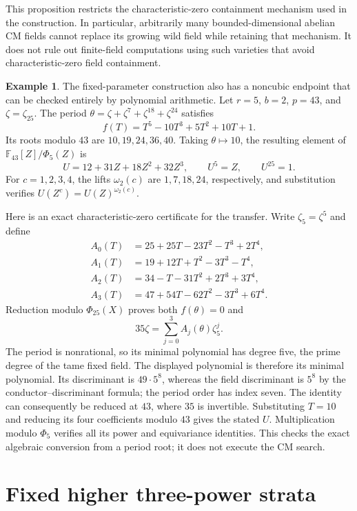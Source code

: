\documentclass[11pt]{article}
\theoremstyle{definition}
\newtheorem{example}[theorem]{Example}
\theoremstyle{remark}
\begin{document}
This proposition restricts the characteristic-zero containment
mechanism used in the construction. In particular, arbitrarily
many bounded-dimensional abelian CM fields cannot replace its
growing wild field while retaining that mechanism. It does not
rule out finite-field computations using such varieties that
avoid characteristic-zero field containment.



\begin{example}\label{ex:fixed-wild-r5-f43}
The fixed-parameter construction also has a noncubic endpoint that
can be checked entirely by polynomial arithmetic. Let \(r=5\),
\(b=2\), \(p=43\), and \(\zeta=\zeta_{25}\). The period
\(\theta=\zeta+\zeta^7+\zeta^{18}+\zeta^{24}\) satisfies
\[
 f(T)=T^5-10T^3+5T^2+10T+1.
\]
Its roots modulo \(43\) are \(10,19,24,36,40\). Taking
\(\theta\mapsto10\), the resulting element of
\(\mathbb F_{43}[Z]/\Phi_5(Z)\) is
\[
 U=12+31Z+18Z^2+32Z^3,
 \qquad U^5=Z,\qquad U^{25}=1.
\]
For \(c=1,2,3,4\), the lifts \(\omega_2(c)\) are
\(1,7,18,24\), respectively, and substitution verifies
\(U(Z^c)=U(Z)^{\omega_2(c)}\).

Here is an exact characteristic-zero certificate for the transfer.
Write \(\zeta_5=\zeta^5\) and define
\[
\begin{aligned}
A_0(T)&=25+25T-23T^2-T^3+2T^4,\\
A_1(T)&=19+12T+T^2-3T^3-T^4,\\
A_2(T)&=34-T-31T^2+2T^3+3T^4,\\
A_3(T)&=47+54T-62T^2-3T^3+6T^4.
\end{aligned}
\]
Reduction modulo \(\Phi_{25}(X)\) proves both
\(f(\theta)=0\) and
\[
 35\zeta=\sum_{j=0}^3 A_j(\theta)\zeta_5^j.
\]
The period is nonrational, so its minimal polynomial has degree
five, the prime degree of the tame fixed field. The displayed
polynomial is therefore its minimal polynomial. Its discriminant
is \(49\cdot5^8\), whereas the field discriminant is
\(5^8\) by the conductor--discriminant formula; the period order
has index seven. The identity can consequently be reduced at
\(43\), where \(35\) is invertible. Substituting \(T=10\)
and reducing its four coefficients modulo \(43\) gives the stated
\(U\). Multiplication modulo \(\Phi_5\) verifies all its power
and equivariance identities. This checks the exact algebraic
conversion from a period root; it does not execute the CM search.
\end{example}

\section{Fixed higher three-power strata}
\label{sec:kummer-higher-three-powers}
\end{document}
